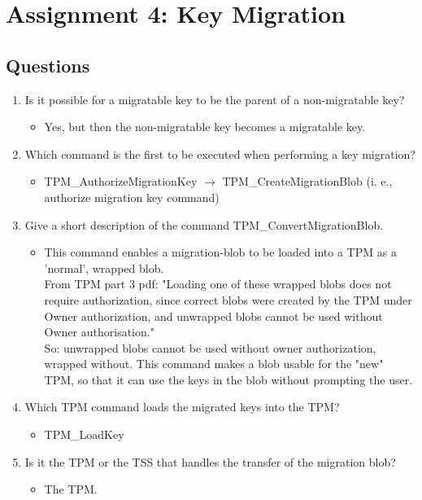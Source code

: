 \documentclass[10pt]{article}
\begin{document}
\section{Assignment 4: Key Migration}
\subsection{Questions}
\begin{enumerate}
    \item {Is it possible for a migratable key to be the parent of a non-migratable key?} 
	\begin{itemize}
	    \item {Yes, but then the non-migratable key becomes a migratable key.}
	\end{itemize}
 
    \item {Which command is the first to be executed when performing a key migration?} 
	\begin{itemize}
	    \item {TPM\_AuthorizeMigrationKey  $\rightarrow$  TPM\_CreateMigrationBlob  (i. e., authorize migration key command)}
	\end{itemize}

    \item {Give a short description of the command TPM\_ConvertMigrationBlob.}
	\begin{itemize}
	    \item {This command enables a migration-blob to be loaded into a TPM as a 'normal', wrapped blob.\\
From TPM part 3 pdf: "Loading one of these wrapped blobs does not require authorization, since correct blobs were created by the TPM under Owner authorization, and unwrapped blobs cannot be used without Owner authorisation." \\
So: unwrapped blobs cannot be used without owner authorization, wrapped without. This command makes a blob usable for the "new" TPM, so that it can use the keys in the blob without prompting the user.}
	\end{itemize}

    \item {Which TPM command loads the migrated keys into the TPM?}
	\begin{itemize}
	    \item {TPM\_LoadKey}
	\end{itemize}

    \item {Is it the TPM or the TSS that handles the transfer of the migration blob? }
	\begin{itemize}
	    \item {The TPM.}
	\end{itemize}
\end{enumerate}
\end{document}
